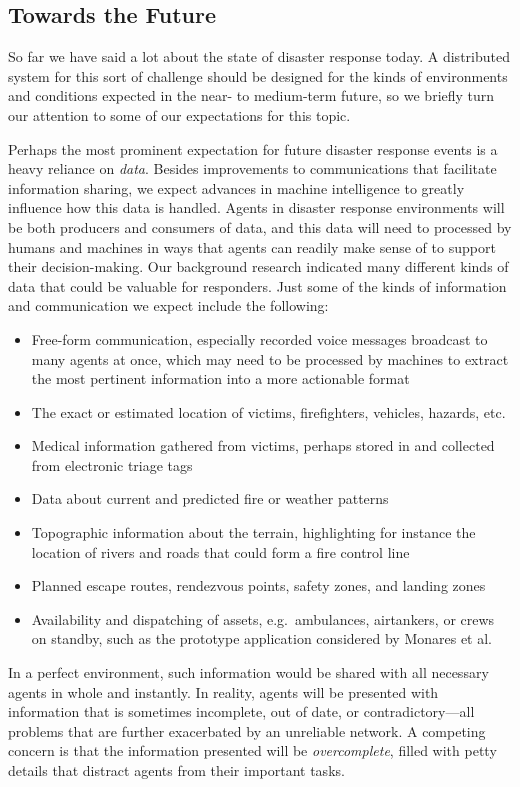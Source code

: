 \documentclass[]             %
{NASA}                       %
\theoremstyle{definition}
\begin{document}
\subsection{Towards the Future}
\label{towards-the-future}
So far we have said a lot about the state of disaster response
today. A distributed system for this sort of challenge should be
designed for the kinds of environments and conditions expected in the
near- to medium-term future, so we briefly turn our attention to some
of our expectations for this topic.

Perhaps the most prominent expectation for future disaster response
events is a heavy reliance on \emph{data}. Besides improvements to
communications that facilitate information sharing, we expect advances
in machine intelligence to greatly influence how this data is
handled. Agents in disaster response environments will be both
producers and consumers of data, and this data will need to processed
by humans and machines in ways that agents can readily make sense of
to support their decision-making. Our background research indicated
many different kinds of data that could be valuable for
responders. Just some of the kinds of information and communication we
expect include the following:
\begin{itemize}
\item Free-form communication, especially recorded voice messages
  broadcast to many agents at once, which may need to be processed by
  machines to extract the most pertinent information into a more
  actionable format
\item The exact or estimated location of victims, firefighters,
  vehicles, hazards, etc.
\item Medical information gathered from victims, perhaps stored in and
  collected from electronic triage tags \cite{2009:triagetag}
\item Data about current and predicted fire or weather patterns
\item Topographic information about the terrain, highlighting for
  instance the location of rivers and roads that could form a fire
  control line
\item Planned escape routes, rendezvous points, safety zones, and
  landing zones
\item Availability and dispatching of assets, e.g.~ambulances,
  airtankers, or crews on standby, such as the prototype application
  considered by Monares et al. \cite{2011:monares}
\end{itemize}
In a perfect environment, such information would be shared with all
necessary agents in whole and instantly. In reality, agents will be
presented with information that is sometimes incomplete, out of date,
or contradictory---all problems that are further exacerbated by an
unreliable network. A competing concern is that the information
presented will be \emph{overcomplete}, filled with petty details that
distract agents from their important tasks.
\end{document}
